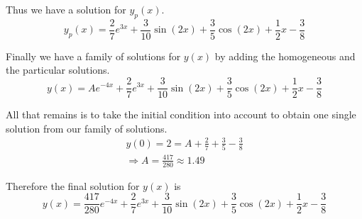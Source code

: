 \documentclass[fleqn]{article}
\begin{document}
Thus we have a solution for \(y_p(x)\).
\begin{equation*}
	y_p(x) = \frac{2}{7} e^{3x} + \frac{3}{10} \sin(2x) + \frac{3}{5} \cos(2x) + \frac{1}{2} x - \frac{3}{8}
\end{equation*}

Finally we have a family of solutions for \(y(x)\) by adding the homogeneous and the particular solutions.
\begin{equation*}
	y(x) = A e^{-4x} + \frac{2}{7} e^{3x} + \frac{3}{10} \sin(2x) + \frac{3}{5} \cos(2x) + \frac{1}{2} x - \frac{3}{8}
\end{equation*}

All that remains is to take the initial condition into account to obtain one single solution from our family of solutions.
\begin{gather*}
	y(0) = 2 = A + \frac{2}{7} + \frac{3}{5} - \frac{3}{8} \\
	\Rightarrow A = \frac{417}{280} \approx 1.49
\end{gather*}

Therefore the final solution for \(y(x)\) is
\begin{equation*}
	y(x) = \frac{417}{280} e^{-4x} + \frac{2}{7} e^{3x} + \frac{3}{10} \sin(2x) + \frac{3}{5} \cos(2x) + \frac{1}{2} x - \frac{3}{8}
\end{equation*}
\end{document}
